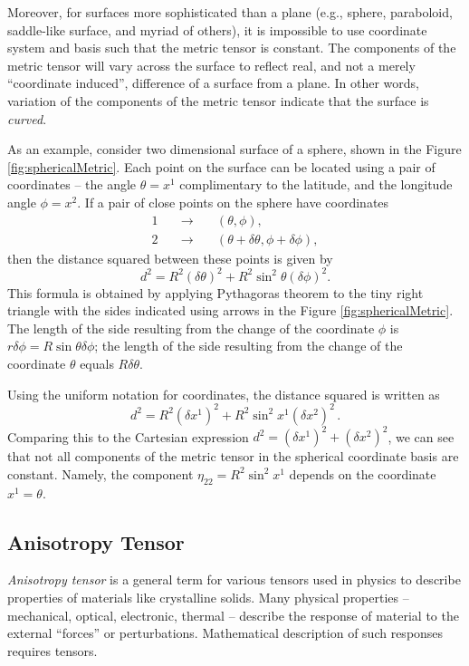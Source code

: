 Moreover, for surfaces more sophisticated than a plane
(e.g., sphere, paraboloid, saddle-like surface, and myriad of others),
it is impossible to use coordinate system and basis such that the metric
tensor is constant. The components of the metric tensor will vary
across the surface to reflect real, and not a merely ``coordinate
induced'', difference of a surface from a plane. In other words,
variation of the components of the metric tensor indicate that the
surface is \emph{curved}.


As an example, consider two dimensional surface of a sphere,
shown in the Figure \ref{fig:sphericalMetric}. Each point on the
surface can be located using a pair of coordinates -- the angle
$\theta=x^1$ complimentary to the latitude, and the longitude angle
$\phi=x^2$. If a pair of close points on the sphere have coordinates
\begin{eqnarray*}
1 & \quad\longrightarrow \quad & (\theta, \phi),\\
2 & \quad\longrightarrow \quad & (\theta+\delta\theta, \phi+\delta\phi),
\end{eqnarray*}
then the distance squared between these points is given by
\[
d^2 = R^2(\delta\theta)^2 + R^2\sin^2\theta(\delta \phi)^2.
\]
This formula is obtained by applying Pythagoras theorem to the
tiny right triangle with the sides indicated using arrows in the Figure
\ref{fig:sphericalMetric}. The length of the side resulting from the
change of the coordinate $\phi$ is $r\delta\phi =
R\sin\theta\delta\phi$; the length of the side resulting from the
change of the coordinate $\theta$ equals $R\delta\theta$.

Using the uniform notation for coordinates, the distance squared is
written as
\[
d^2 = R^2(\delta x^1)^2 + R^2\sin^2 x^1(\delta x^2)^2\,.
\]
Comparing this to the Cartesian expression
$d^2 = (\delta x^1)^2 +(\delta x^2)^2$, we can see that not all
components of the metric tensor in the
spherical coordinate basis are constant. Namely, the component
$\eta_{22}=R^2\sin^2 x^1$ depends on the coordinate $x^1=\theta$.

\subsection{Anisotropy Tensor}
\emph{Anisotropy tensor} is a general term for various tensors used in
physics to describe properties of materials like crystalline
solids. Many physical properties -- mechanical, optical, electronic, thermal --
describe the response of material to the external
``forces'' or perturbations. Mathematical description of such
responses requires tensors.

